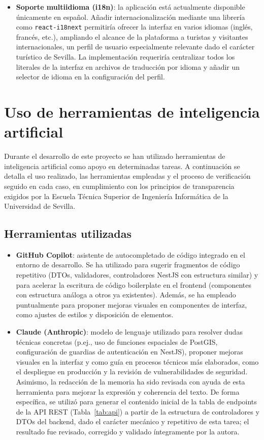 \begin{itemize}
    \item \textbf{Soporte multiidioma (i18n)}: la aplicación está actualmente disponible únicamente en español. Añadir internacionalización mediante una librería como \texttt{react-i18next} permitiría ofrecer la interfaz en varios idiomas (inglés, francés, etc.), ampliando el alcance de la plataforma a turistas y visitantes internacionales, un perfil de usuario especialmente relevante dado el carácter turístico de Sevilla. La implementación requeriría centralizar todos los literales de la interfaz en archivos de traducción por idioma y añadir un selector de idioma en la configuración del perfil.
\end{itemize}

\section{Uso de herramientas de inteligencia artificial}

Durante el desarrollo de este proyecto se han utilizado herramientas de inteligencia artificial como apoyo en determinadas tareas. A continuación se detalla el uso realizado, las herramientas empleadas y el proceso de verificación seguido en cada caso, en cumplimiento con los principios de transparencia exigidos por la Escuela Técnica Superior de Ingeniería Informática de la Universidad de Sevilla.

\subsection{Herramientas utilizadas}

\begin{itemize}
    \item \textbf{GitHub Copilot}: asistente de autocompletado de código integrado en el entorno de desarrollo. Se ha utilizado para sugerir fragmentos de código repetitivo (DTOs, validadores, controladores NestJS con estructura similar) y para acelerar la escritura de código boilerplate en el frontend (componentes con estructura análoga a otros ya existentes). Además, se ha empleado puntualmente para proponer mejoras visuales en componentes de interfaz, como ajustes de estilos y disposición de elementos.

    \item \textbf{Claude (Anthropic)}: modelo de lenguaje utilizado para resolver dudas técnicas concretas (p.ej., uso de funciones espaciales de PostGIS, configuración de guardias de autenticación en NestJS), proponer mejoras visuales en la interfaz y como guía en procesos técnicos más elaborados, como el despliegue en producción y la revisión de vulnerabilidades de seguridad. Asimismo, la redacción de la memoria ha sido revisada con ayuda de esta herramienta para mejorar la expresión y coherencia del texto. De forma específica, se utilizó para generar el contenido inicial de la tabla de endpoints de la API REST (Tabla~\ref{tab:api}) a partir de la estructura de controladores y DTOs del backend, dado el carácter mecánico y repetitivo de esta tarea; el resultado fue revisado, corregido y validado íntegramente por la autora.
\end{itemize}

